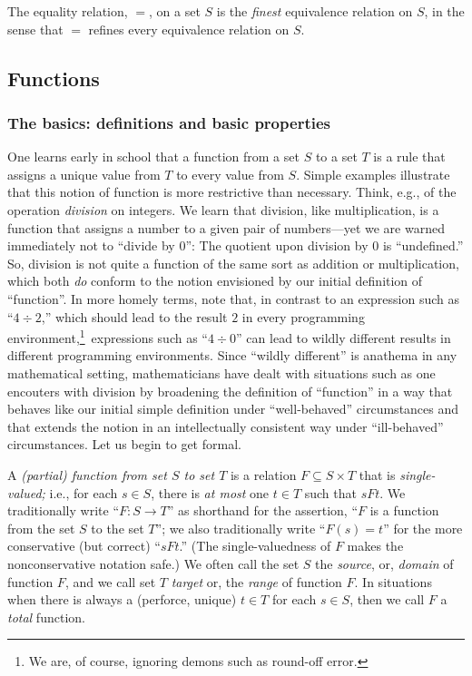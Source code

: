 \begin{theorem}
\label{thm:equality=finest-equiv}
The equality relation, $=$, on a set $S$ is the {\em finest}
equivalence relation on $S$, in the sense that $=$ refines every
equivalence relation on $S$.
\end{theorem}

\subsection{Functions}
\label{sec:function}

\subsubsection{The basics: definitions and basic properties}
\label{sec:basic-functions}

One learns early in school that a function from a set $S$ to a set $T$
is a rule that assigns a unique value from $T$ to every value from
$S$.  Simple examples illustrate that this notion of function is more
restrictive than necessary.  Think, e.g., of the operation {\em
  division} on integers.  We learn that division, like multiplication,
is a function that assigns a number to a given pair of numbers---yet
we are warned immediately not to ``divide by $0$'': The quotient upon
division by $0$ is ``undefined.''  So, division is not quite a
function of the same sort as addition or multiplication, which both
{\em do} conform to the notion envisioned by our initial definition of
``function''.  In more homely terms, note that, in contrast to an
expression such as ``$4 \div 2$,'' which should lead to the result $2$
in every programming environment,\footnote{We are, of course, ignoring
  demons such as round-off error.}~expressions such as ``$4 \div 0$''
can lead to wildly different results in different programming
environments.  Since ``wildly different'' is anathema in any
mathematical setting, mathematicians have dealt with situations such
as one encouters with division by broadening the definition of
``function'' in a way that behaves like our initial simple definition
under ``well-behaved'' circumstances and that extends the notion in an
intellectually consistent way under ``ill-behaved'' circumstances.
Let us begin to get formal.

 
 
A {\it (partial) function from set $S$ to set $T$} is a relation $F
\subseteq S \times T$ that is {\it single-valued;} i.e., for each $s
\in S$, there is {\em at most} one $t \in T$ such that $sFt$.  We
traditionally write ``$F: S \rightarrow T$'' as shorthand for the
assertion, ``$F$ is a function from the set $S$ to the set $T$''; we
also traditionally write ``$F(s) = t$'' for the more conservative (but
correct) ``$sFt$.''  (The single-valuedness of $F$ makes the
nonconservative notation safe.)  We often call the set $S$ the {\em
  source}, or, {\it domain} of function $F$, and we call set $T$ {\em
  target} or, the {\it range} of function $F$.  In situations when
there is always a (perforce, unique) $t \in T$ for each $s \in S$,
then we call $F$ a {\em total} function.


